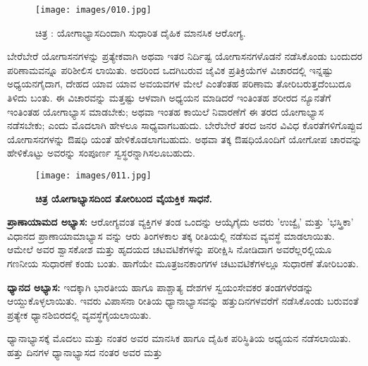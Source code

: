 \begin{center}
\end{center}


\begin{figure}
\texttt{[image: images/010.jpg]}
\caption{ಚಿತ್ರ : ಯೋಗಾಭ್ಯಾಸದಿಂದಾಗಿ ಸುಧಾರಿತ ದೈಹಿಕ ಮಾನಸಿಕ ಆರೋಗ್ಯ.}
\end{figure}

ಬೇರೆಬೇರೆ ಯೋಗಾಸನಗಳನ್ನು ಪ್ರತ್ಯೇಕವಾಗಿ ಅಥವಾ ಇತರ ನಿರ್ದಿಷ್ಟ ಯೋಗಾಸನಗಳೊಡನೆ ನಡೆಸಿಕೊಂಡು ಬಂದುದರ ಪರಿಣಾಮವನ್ನೂ ಪರಿಶೀಲಿಸ ಲಾಯಿತು. ಅದರಿಂದ ಒದಗಿಬರುವ ಜೈವಿಕ ಪ್ರತಿಕ್ರಿಯೆಗಳ ವಿಚಾರದಲ್ಲಿ ಇನ್ನಷ್ಟು ಅಧ್ಯಯನಗೈದಾಗ, ದೇಹದ ಯಾವ ಯಾವ ಅವಯವಗಳ ಮೇಲೆ ಎಂತೆಂತಹ ಪರಿಣಾಮ ತೋರಿಬರುತ್ತದೆಂಬುದೂ ತಿಳಿದು ಬಂತು. ಈ ವಿಚಾರವನ್ನು ಮತ್ತಷ್ಟು ಆಳವಾಗಿ ಅಧ್ಯಯನ ಮಾಡಿದರೆ ಇಂತಿಂತಹ ಶರೀರದ ನ್ಯೂನತೆಗೆ ಇಂತಿಂತಹ ಯೋಗಾಭ್ಯಾಸ ಮಾಡಬೇಕು; ಅಥವಾ ಇಂತಹ ಕಾಯಿಲೆ ನಿವಾರಣೆಗೆ ಈ ತರದ ಯೋಗಾಭ್ಯಾಸ ನಡೆಸಬೇಕು; ಎಂದು ಮೊದಲಾಗಿ ಹೇಳಲೂ ಸಾಧ್ಯವಾಗಬಹುದು. ಬೇರೆಬೇರೆ ತರದ ಜನರ ವಿವಿಧ ಕೊರತೆಗಳಿಗೊಪ್ಪುವ ಯೋಗಾಸನಗಳನ್ನು ಔಷಧಿ ಯಂತೆ ಹೇಳಿಕೊಡಲಾಗಬಹುದು. ಅಥವಾ ತಕ್ಕ ಔಷಧಿಯೊಂದಿಗೆ ಯೋಗೋಪ ಚಾರವನ್ನು ಹೇಳಿಕೊಟ್ಟು ಅವರನ್ನು ಸಂಪೂರ್ಣ ಸ್ವಸ್ಥರನ್ನಾಗಿಸಲೂಬಹುದು.

\begin{figure}
\texttt{[image: images/011.jpg]}
\caption{\textbf{ಚಿತ್ರ  ಯೋಗಾಭ್ಯಾಸದಿಂದ ತೋರಿಬಂದ ವೈಯಕ್ತಿಕ ಸಾಧನೆ.} }
\end{figure}

\textbf{ಪ್ರಾಣಾಯಾಮದ ಅಭ್ಯಾಸ:} ಆರೋಗ್ಯವಂತ ವ್ಯಕ್ತಿಗಳ ತಂಡ ಒಂದನ್ನು ಆಯ್ಕೆಗೈದು ಅವರು 'ಉಜ್ವೈ' ಮತ್ತು 'ಭಸ್ತ್ರಿಕಾ' ವಿಧಾನದ ಪ್ರಾಣಾಯಾಮಾಭ್ಯಾಸ ವನ್ನು ಆರು ತಿಂಗಳಕಾಲ ತಕ್ಕ ರೀತಿಯಲ್ಲಿ ನಡೆಸುವ ವ್ಯವಸ್ಥೆ ಮಾಡಲಾಯಿತು. ಆಮೇಲೆ ಅವರ ಶ್ವಾಸಕೋಶ ಮತ್ತು ಹೃದಯದ ಚಟವಟಿಕೆಗಳನ್ನು ಪರೀಕ್ಷಿಸಿ ನೋಡಿದಾಗ ಅವರೆಲ್ಲರಲ್ಲಿಯೂ ಗಣನೀಯ ಸುಧಾರಣೆ ಕಂಡು ಬಂತು. ಹಾಗೆಯೇ ಮೂತ್ರಜನಕಾಂಗಗಳ  ಚಟುವಟಿಕೆಗಳಲ್ಲೂ ಸುಧಾರಣೆ ತೋರಿಬಂತು.

\textbf{ಧ್ಯಾನದ ಅಭ್ಯಾಸ:} ಇದಕ್ಕಾಗಿ ಭಾರತೀಯ ಹಾಗೂ ಪಾಶ್ಚಾತ್ಯ ದೇಶಗಳ ಸ್ವಯಂಸೇವಕರ ತಂಡಗಳೆರಡನ್ನು ಆಯ್ದುಕೊಳ್ಳಲಾಯಿತು. ಇವರು ವಿಪಾಸನಾ ರೀತಿಯ ಧ್ಯಾನಾಭ್ಯಾಸವನ್ನು ಹತ್ತುದಿನಗಳವರೆಗೆ ನಡೆಸಿಕೊಂಡು ಬರುವಂತೆ ಪ್ರತ್ಯೇಕ ಧ್ಯಾನಶಿಬಿರದಲ್ಲಿ ವ್ಯವಸ್ಥೆಗೈಯಲಾಯಿತು.

ಧ್ಯಾನಾಭ್ಯಾಸಕ್ಕೆ ಮೊದಲು ಮತ್ತು ನಂತರ ಅವರ ಮಾನಸಿಕ ಹಾಗೂ ದೈಹಿಕ ಪರಿಸ್ಥಿತಿಯ ಅಧ್ಯಯನ ನಡೆಸಲಾಯಿತು. ಹತ್ತು ದಿನಗಳ ಧ್ಯಾನಾಭ್ಯಾಸದ ನಂತರ ಅವರ  ಮತ್ತು 

